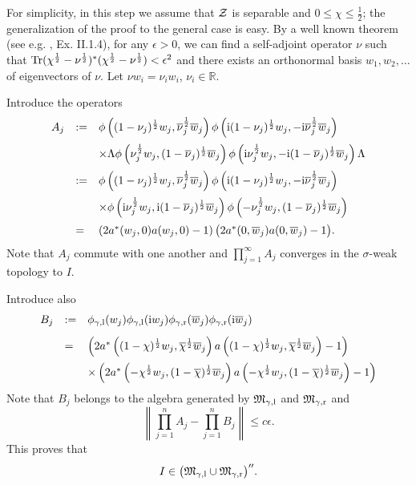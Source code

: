 \documentclass{svmult}
\newcommand{\beq}{\begin{equation}}
\newcommand{\eeq}{\end{equation}}
\def\rr{{\mathbb R}}
\def\bar{\overline}
\def\l{{\rm l}}
\def\r{{\rm r}}
\def\cZ{{\cal Z}}
\def\fM{{\mathfrak M}}
\def\i{{\rm i}}
\def\Tr{{\rm Tr}}
\def\l{{\rm l}}
\def\r{{\rm r}}
\def\Tr{{\rm Tr}}
\begin{document}
For simplicity, in this step 
we assume that $\cZ$ is separable and $0\leq \chi\leq\frac12$;
 the generalization of the
proof to the general case is easy. By a well known theorem (see
e.g. \cite{Ta1}, Ex. II.1.4), for any $\epsilon>0$, we can find a self-adjoint
operator $\nu$ such that
$\Tr(\chi^{\frac12}-\nu^{\frac12})^*(\chi^{\frac12}-\nu^{\frac12})
<\epsilon^2$ and there
exists an orthonormal basis $w_1,w_2,\dots$ of eigenvectors of $\nu$. Let
$\nu w_i=\nu_{i}w_i$, $\nu_{i}\in\rr$.

Introduce the operators
\[\begin{array}{rll}
A_j&:=&
\phi\left((1-\nu_j)^{\frac12} w_j, \bar\nu_j^{\frac12}\bar w_j\right)
\phi\left(\i(1-\nu_j)^{\frac12} w_j, -\i\bar\nu_j^{\frac12}\bar w_j\right)
\\[3mm]&&\times\Lambda
\phi\left(\nu_j^{\frac12} w_j, (1-\bar\nu_j)^{\frac12}\bar w_j\right)
\phi\left(\i\nu_j^{\frac12} w_j, -\i(1-\bar\nu_j)^{\frac12}\bar w_j\right)
\Lambda
\\[3mm]
&:=&
\phi\left((1-\nu_j)^{\frac12} w_j, \bar\nu_j^{\frac12}\bar w_j\right)
\phi\left(\i(1-\nu_j)^{\frac12} w_j, -\i\bar\nu_j^{\frac12}\bar w_j\right)
\\[3mm]
&&\times
\phi\left(\i\nu_j^{\frac12} w_j, \i(1-\bar\nu_j)^{\frac12}\bar w_j\right)
\phi\left(-\nu_j^{\frac12} w_j, (1-\bar\nu_j)^{\frac12}\bar w_j\right)
\\[3mm]
&=&\left(2a^*(w_j,0)a(w_j,0)-1
\right)
\bigl(2a^*(0,\bar w_j)a(0,\bar w_j)-1
\bigr).
\end{array}\]
Note that $A_j$ commute with one another and $\prod\limits_{j=1}^\infty A_j$
converges in the $\sigma$-weak topology to $I$.

Introduce also
\[\begin{array}{rll}
B_j&:=&
\phi_{\gamma,\l}(w_j)\phi_{\gamma,\l}(\i w_j)
\phi_{\gamma,\r}(\bar w_j)\phi_{\gamma,\r}(\i\bar w_j)\\[3mm]
&=&\left(
2a^*\left((1-\chi)^{\frac12}w_j,\bar\chi^{\frac12}\bar w_j\right)
a\left((1-\chi)^{\frac12}w_j,\bar\chi^{\frac12}\bar w_j\right)-1\right)
\\[3mm]
&&\times\left(
2a^*\left(-\chi^{\frac12}w_j,(1-\bar\chi)^{\frac12}\bar w_j\right)
a\left(-\chi^{\frac12}w_j,(1-\bar\chi)^{\frac12}\bar w_j\right)-1\right)
\end{array}\]
Note that $B_j$ belongs to the algebra generated by
$\fM_{\gamma,\l}$ and $\fM_{\gamma,\r}$ and
\[\left\|\prod\limits_{j=1}^n A_j-\prod\limits_{j=1}^n B_j
\right\|\leq
c\epsilon.\] This proves that 
\beq
I\in \bigl(\fM_{\gamma,\l}\cup\fM_{\gamma,\r}\bigr)''.\label{step}\eeq
\end{document}
